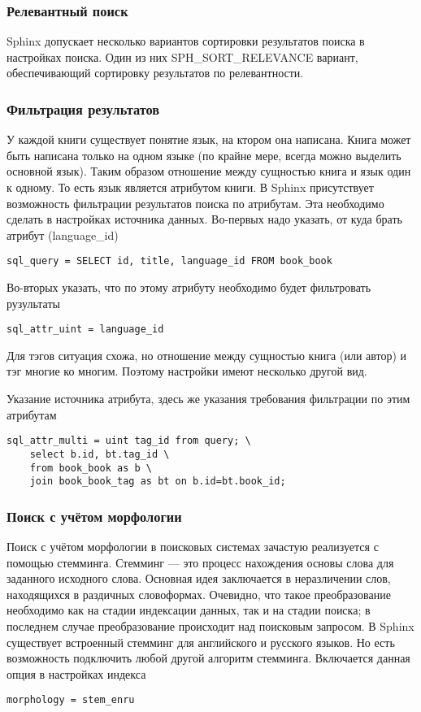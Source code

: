\subsubsection{Релевантный поиск}

Sphinx допускает несколько вариантов сортировки результатов поиска в настройках поиска.
Один из них SPH\_SORT\_RELEVANCE вариант, обеспечивающий сортировку результатов по релевантности.

\subsubsection{Фильтрация результатов}

У каждой книги существует понятие язык, на ктором она написана.
Книга может быть написана только на одном языке (по крайне мере, всегда можно выделить основной язык).
Таким образом отношение между сущностью книга и язык один к одному.
То есть язык является атрибутом книги. В Sphinx присутствует возможность фильтрации результатов поиска по атрибутам.
Эта необходимо сделать в настройках источника данных. Во-первых надо указать, от куда брать атрибут (language\_id)
\begin{verbatim}
sql_query = SELECT id, title, language_id FROM book_book
\end{verbatim}
Во-вторых указать, что по этому атрибуту необходимо будет фильтровать рузультаты
\begin{verbatim}
sql_attr_uint = language_id
\end{verbatim}

Для тэгов ситуация схожа, но отношение между сущностью книга (или автор) и тэг многие ко многим.
Поэтому настройки имеют несколько другой вид.

Указание источника атрибута, здесь же указания требования фильтрации по этим атрибутам
\begin{verbatim}
sql_attr_multi = uint tag_id from query; \
	select b.id, bt.tag_id \
	from book_book as b \
	join book_book_tag as bt on b.id=bt.book_id;
\end{verbatim}


\subsubsection{Поиск с учётом морфологии}

Поиск с учётом морфологии в поисковых системах зачастую реализуется с помощью стемминга. Стемминг \cite{stemming} --- это процесс нахождения основы слова для заданного исходного слова.
Основная идея заключается в неразличении слов, находящихся в раздичных словоформах.
Очевидно, что такое преобразование необходимо как на стадии индексации данных, так и на стадии поиска; в последнем случае преобразование происходит над поисковым запросом.
В Sphinx существует встроенный стемминг для английского и русского языков.
Но есть возможность подключить любой другой алгоритм стемминга.
Включается данная опция в настройках индекса
\begin{verbatim}
morphology = stem_enru
\end{verbatim}
